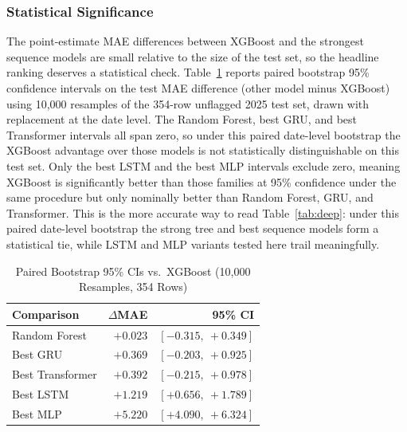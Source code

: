 \documentclass[conference]{IEEEtran}
\begin{document}
\begin{table}[t]
\centering
\caption{Best Model per Family on Unflagged 2025 Test Rows}
\label{tab:deep}
\end{table}

\subsubsection{Statistical Significance}
The point-estimate MAE differences between XGBoost and the strongest sequence models are small relative to the size of the test set, so the headline ranking deserves a statistical check. Table~\ref{tab:bootstrap} reports paired bootstrap 95\% confidence intervals on the test MAE difference (other model minus XGBoost) using 10,000 resamples of the 354-row unflagged 2025 test set, drawn with replacement at the date level. The Random Forest, best GRU, and best Transformer intervals all span zero, so under this paired date-level bootstrap the XGBoost advantage over those models is not statistically distinguishable on this test set. Only the best LSTM and the best MLP intervals exclude zero, meaning XGBoost is significantly better than those families at 95\% confidence under the same procedure but only nominally better than Random Forest, GRU, and Transformer. This is the more accurate way to read Table~\ref{tab:deep}: under this paired date-level bootstrap the strong tree and best sequence models form a statistical tie, while LSTM and MLP variants tested here trail meaningfully.

\begin{table}[t]
\centering
\caption{Paired Bootstrap 95\% CIs vs.\ XGBoost (10,000 Resamples, 354 Rows)}
\label{tab:bootstrap}
\begin{tabular}{lrr}
\toprule
Comparison & $\Delta$MAE & 95\% CI\\
\midrule
Random Forest    & $+0.023$ & $[-0.315,\ +0.349]$\\
Best GRU         & $+0.369$ & $[-0.203,\ +0.925]$\\
Best Transformer & $+0.392$ & $[-0.215,\ +0.978]$\\
Best LSTM        & $+1.219$ & $[+0.656,\ +1.789]$\\
Best MLP         & $+5.220$ & $[+4.090,\ +6.324]$\\
\bottomrule
\end{tabular}
\end{table}
\end{document}
